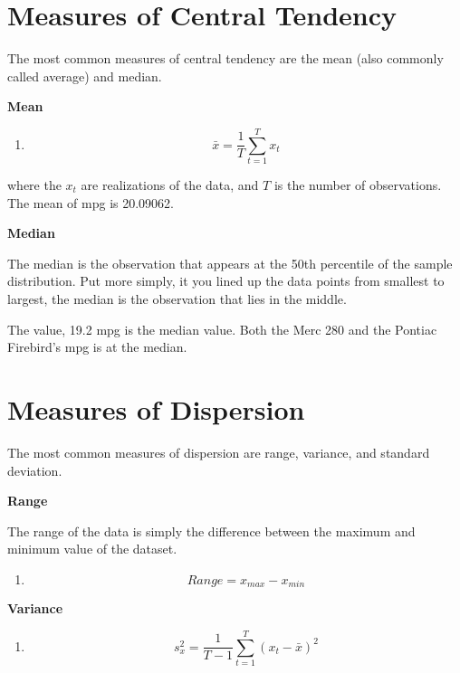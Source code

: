 \documentclass[]{book}
\providecommand{\tightlist}{%
  \setlength{\itemsep}{0pt}\setlength{\parskip}{0pt}}
\theoremstyle{definition}
\theoremstyle{definition}
\theoremstyle{remark}
\begin{document}
\section{Measures of Central
Tendency}\label{measures-of-central-tendency}

The most common measures of central tendency are the mean (also commonly
called average) and median.

\textbf{Mean}

\begin{enumerate}
\def\labelenumi{\arabic{enumi}.}
\tightlist
\item
  \[\bar{x} = \frac{1}{T}\sum_{t=1}^{T} x_t\]
\end{enumerate}

where the \(x_t\) are realizations of the data, and \(T\) is the number
of observations. The mean of mpg is 20.09062.

\textbf{Median}

The median is the observation that appears at the 50th percentile of the
sample distribution. Put more simply, it you lined up the data points
from smallest to largest, the median is the observation that lies in the
middle.

The value, 19.2 mpg is the median value. Both the Merc 280 and the
Pontiac Firebird's mpg is at the median.

\section{Measures of Dispersion}\label{measures-of-dispersion}

The most common measures of dispersion are range, variance, and standard
deviation.

\textbf{Range}

The range of the data is simply the difference between the maximum and
minimum value of the dataset.

\begin{enumerate}
\def\labelenumi{\arabic{enumi}.}
\setcounter{enumi}{1}
\tightlist
\item
  \[Range = x_{max} - x_{min}\]
\end{enumerate}

\textbf{Variance}

\begin{enumerate}
\def\labelenumi{\arabic{enumi}.}
\setcounter{enumi}{2}
\tightlist
\item
  \[s_x^2 = \frac{1}{T-1}\sum_{t=1}^{T} (x_t - \bar{x})^2 \]
\end{enumerate}
\end{document}
